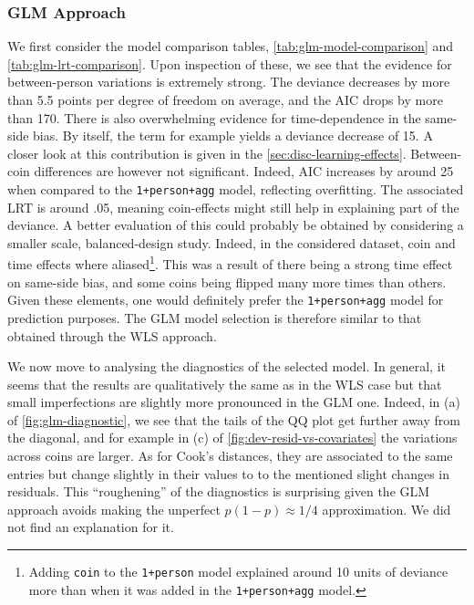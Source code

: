 \documentclass[a4paper, 12pt,oneside]{article}
\begin{document}
		\subsubsection{GLM Approach}
			We first consider the model comparison tables, \ref{tab:glm-model-comparison} and \ref{tab:glm-lrt-comparison}. 
			Upon inspection of these, we see that the evidence for between-person variations is extremely strong. The deviance decreases by more than 5.5 points per degree of freedom on average, and the AIC drops by more than 170. There is also overwhelming evidence for time-dependence in the same-side bias. By itself, the term for example yields a deviance decrease of 15. A closer look at this contribution is given in the \ref{sec:disc-learning-effects}. 
			Between-coin differences are however not significant. Indeed, AIC increases by around 25 when compared to the \texttt{1+person+agg} model, reflecting overfitting. The associated LRT is around .05, meaning coin-effects might still help in explaining part of the deviance. A better evaluation of this could probably be obtained by considering a smaller scale, balanced-design study. Indeed, in the considered dataset, coin and time effects where aliased\footnote{Adding \texttt{coin} to the \texttt{1+person} model explained around 10 units of deviance more than when it was added in the \texttt{1+person+agg} model.}. This was a result of there being a strong time effect on same-side bias, and some coins being flipped many more times than others. 
			Given these elements, one would definitely prefer the \texttt{1+person+agg} model for prediction purposes.  
			The GLM model selection is therefore similar to that obtained through the WLS approach. 


			We now move to analysing the diagnostics of the selected model. In general, it seems that the results are qualitatively the same as in the WLS case but that small imperfections are slightly more pronounced in the GLM one. Indeed, in (a) of \ref{fig:glm-diagnostic}, we see that the tails of the QQ plot get further away from the diagonal, and for example in (c) of \ref{fig:dev-resid-vs-covariates} the variations across coins are larger.
			As for Cook's distances, they are associated to the same entries but change slightly in their values to to the mentioned slight changes in residuals.
			This ``roughening'' of the diagnostics is surprising given the GLM approach avoids making the unperfect $p(1-p)\approx 1/4$ approximation. We did not find an explanation for it. 
		
\end{document}
